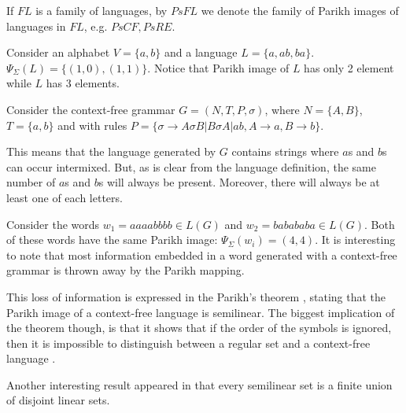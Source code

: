 \begin{definition}
If $FL$ is a family of languages, by $PsFL$ we denote the family of Parikh images of languages in $FL$, e.g. $PsCF, PsRE$.
\end{definition}

\begin{example}
Consider an alphabet $V=\{a,b\}$ and a language $L=\{a, ab, ba\}$.
$\Psi_\Sigma(L)=\{(1,0), (1,1)\}$. Notice that Parikh image of $L$ has only 2 element while $L$ has 3 elements.
\end{example}

\begin{example}
  Consider the context-free grammar $G = (N,T,P,\sigma)$, where $N=\{A,B\}$, $T=\{a,b\}$ and with rules $P=\{\sigma\rightarrow A\sigma B|B\sigma A|ab, A\rightarrow a, B\rightarrow b\}$.

  This means that the language generated by $G$ contains strings where $a$s and $b$s can occur intermixed. But, as is clear from the language definition, the same number of $a$s and $b$s will always be present. Moreover, there will always be at least one of each letters.

  Consider the words $w_1 = aaaabbbb \in L(G)$ and $w_2 = babababa \in L(G)$. Both of these words have the same Parikh image: $\Psi_\Sigma(w_i) = (4,4)$. It is interesting to note that most information embedded in a word generated with a context-free grammar is thrown away by the Parikh mapping.
\end{example}

This loss of information is expressed in the Parikh's theorem \cite{Parikh66}, stating that the Parikh image of a context-free language is semilinear. The biggest implication of the theorem though, is that it shows that if the order of the symbols is ignored, then it is impossible to distinguish between a regular set and a context-free language \cite{Kozen97Automata}.

Another interesting result appeared in \cite{Ito69Semilinear} that every semilinear set is a finite union of disjoint linear sets.


